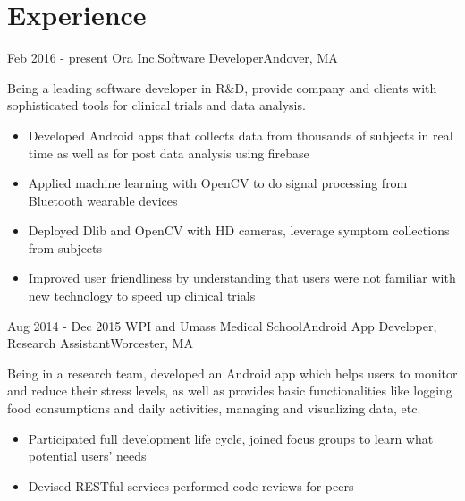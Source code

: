 \documentclass[10pt,a4paper,merriweather]{moderncv}        %
\begin{document}
\makecvtitle
\vspace{-1.5cm}

\section{Experience}

\cventry
{Feb 2016 - present}
{Ora Inc.}{Software Developer}{Andover, MA}{}
{Being a leading software developer in R\&D, provide company and clients with sophisticated tools for clinical trials and data analysis.
\begin{itemize}
\item Developed Android apps that collects data from thousands of subjects in real time as well as for post data analysis using firebase
\item Applied machine learning with OpenCV to do signal processing from Bluetooth wearable devices
\item Deployed Dlib and OpenCV with HD cameras, leverage symptom collections from subjects
\item Improved user friendliness by understanding that users were not familiar with new technology to speed up clinical trials
\end{itemize}}
\vspace{.05cm}

\cventry
{Aug 2014 - Dec 2015}
{WPI and Umass Medical School}{Android App Developer, Research Assistant}{Worcester, MA}{}
{Being in a research team, developed an Android app which helps users to monitor and reduce their stress levels, as well as provides basic functionalities like logging food consumptions and daily activities, managing and visualizing data, etc. 
\begin{itemize}
\item Participated full development life cycle, joined focus groups to learn what potential users' needs
\item Devised RESTful services performed code reviews for peers
\end{itemize}}

\end{document}
